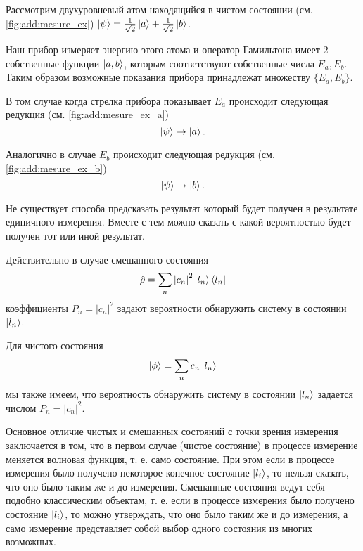 \begin{example}
Рассмотрим двухуровневый атом находящийся в чистом состоянии
(см. \autoref{fig:add:mesure_ex}) 
\(
\left|\psi\right> = \frac{1}{\sqrt{2}}\ket{a}
+ \frac{1}{\sqrt{2}}\ket{b}
\).



Наш прибор измеряет энергию этого атома и  оператор
Гамильтона имеет 2 собственные функции $\ket{a,b}$, которым
соответствуют собственные числа $E_a, E_b$. Таким образом возможные
показания прибора принадлежат множеству $\{E_a, E_b\}$. 



В том случае когда стрелка прибора показывает $E_a$ происходит
следующая редукция  (см. \autoref{fig:add:mesure_ex_a})
\[
\left|\psi\right> \to \ket{a}.
\]



Аналогично в случае $E_b$ происходит
следующая редукция  (см. \autoref{fig:add:mesure_ex_b})
\[
\left|\psi\right> \to \ket{b}.
\]
\end{example}

Не существует способа предсказать результат который будет получен в
результате единичного измерения. Вместе с тем можно сказать с какой
вероятностью будет получен тот или иной результат.

Действительно в случае смешанного состояния
\begin{equation}
\hat{\rho} = 
\sum_n \left|c_n\right|^2 \ket{l_n}\bra{l_n}
\nonumber
\end{equation}
коэффициенты $P_n = \left|c_n\right|^2$
задают вероятности обнаружить систему в состоянии $\ket{l_n}$. 

Для чистого состояния
\begin{equation}
\left| \phi \right> = 
\sum_n c_n \ket{l_n}
\nonumber
\end{equation}
мы также имеем, что вероятность обнаружить систему в состоянии
$\ket{l_n}$ задается числом $P_n = \left|c_n\right|^2$. 

Основное отличие чистых и смешанных состояний с точки зрения измерения
заключается в том, что в первом случае (чистое состояние) в процессе
измерение меняется волновая функция, т. е. само состояние. При этом
если в процессе измерения было получено некоторое конечное состояние
$\ket{l_i}$, то нельзя сказать, что оно было таким же и до
измерения. Смешанные состояния ведут себя подобно классическим объектам,
т. е. если в процессе измерения было получено состояние
$\ket{l_i}$, то можно утверждать, что оно было таким же и до
измерения, а само измерение представляет собой выбор
одного состояния из многих возможных.

